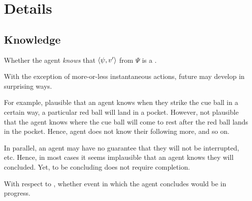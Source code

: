 \section{Details}
\label{sec:details}

\subsection{Knowledge}
\label{sec:knowledge}

\begin{note}
  Whether the agent \emph{knows} that \(\langle \psi, v' \rangle\) from \(\Psi\) is a \fc{}.
\end{note}

\begin{note}
  With the exception of more-or-less instantaneous actions, future may develop in surprising ways.

  For example, plausible that an agent knows when they strike the cue ball in a certain way, a particular red ball will land in a pocket.
  However, not plausible that the agent knows where the cue ball will come to rest after the red ball lands in the pocket.
  Hence, agent does not know their following more, and so on.

  In parallel, an agent may have no guarantee that they will not be interrupted, etc.
  Hence, in most cases it seems implausible that an agent knows they will concluded.
  Yet, to be concluding does not require completion.

  With respect to \fc{}, whether event in which the agent concludes would be in progress.
\end{note}

